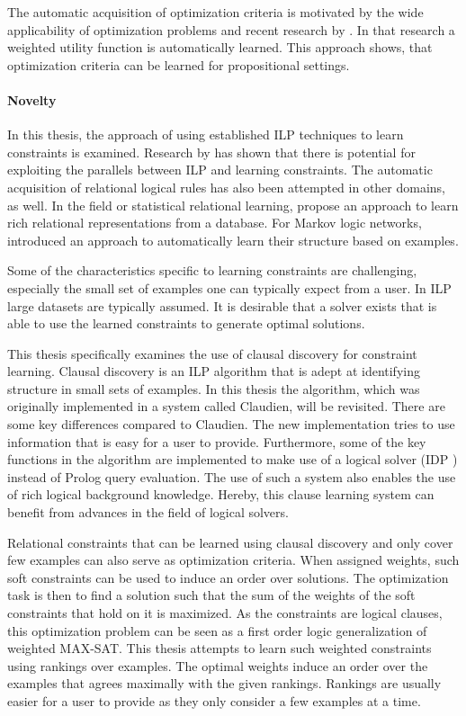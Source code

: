 The automatic acquisition of optimization criteria is motivated by the wide applicability of optimization problems and recent research by \cite{campigotto2011active}.
In that research a weighted utility function is automatically learned.
This approach shows, that optimization criteria can be learned for propositional settings.

\paragraph{Novelty}
In this thesis, the approach of using established ILP techniques to learn constraints is examined. Research by \cite{Lallouet:LearningCP} has shown that there is potential for exploiting the parallels between ILP and learning constraints.
The automatic acquisition of relational logical rules has also been attempted in other domains, as well.
In the field or statistical relational learning, \cite{popescul2003statistical} propose an approach to learn rich relational representations from a database.
For Markov logic networks, \cite{kok2005learning} introduced an approach to automatically learn their structure based on examples.

Some of the characteristics specific to learning constraints are challenging, especially the small set of examples one can typically expect from a user.
In ILP large datasets are typically assumed.
It is desirable that a solver exists that is able to use the learned constraints to generate optimal solutions.

This thesis specifically examines the use of clausal discovery \cite{DeRaedt:ClausalDiscovery} for constraint learning.
Clausal discovery is an ILP algorithm that is adept at identifying structure in small sets of examples. In this thesis the algorithm, which was originally implemented in a system called Claudien, will be revisited. There are some key differences compared to Claudien. The new implementation tries to use information that is easy for a user to provide. Furthermore, some of the key functions in the algorithm are implemented to make use of a logical solver (IDP \cite{wittocx2008idp,de2013prototype}) instead of Prolog query evaluation. The use of such a system also enables the use of rich logical background knowledge. Hereby, this clause learning system can benefit from advances in the field of logical solvers.

Relational constraints that can be learned using clausal discovery and only cover few examples can also serve as optimization criteria.
When assigned weights, such soft constraints can be used to induce an order over solutions.
The optimization task is then to find a solution such that the sum of the weights of the soft constraints that hold on it is maximized.
As the constraints are logical clauses, this optimization problem can be seen as a first order logic generalization of weighted MAX-SAT.
This thesis attempts to learn such weighted constraints using rankings over examples.
The optimal weights induce an order over the examples that agrees maximally with the given rankings.
Rankings are usually easier for a user to provide as they only consider a few examples at a time.

